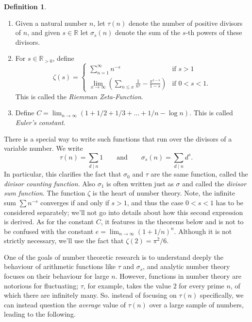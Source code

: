\documentclass[9pt]{report}
\theoremstyle{definition}
\newtheorem{definition}{Definition}
\newcommand\RR{\mathbb R}
\begin{document}
\begin{definition}
    \item
    \begin{enumerate}
        \item Given a natural number \(n\), let \(\tau(n)\) denote the number of positive divisors of \(n\), and given \(s\in\RR\) let \(\sigma_s(n)\) denote the sum of the \(s\)-th powers of these divisors.

        \item For \(s\in\RR_{>0}\), define
            \[
                \zeta(s) =
                \begin{cases}
                    \sum_{n=1}^{\infty} n^{-s} & \text{if } s > 1 \\
                    \lim_{x\to\infty} \left(\sum_{n\le x} \frac{1}{n^s} - \frac{x^{1-s}}{1-s}\right) & \text{if } 0 < s < 1.
                \end{cases}
            \]
            This is called the \textit{Riemman Zeta-Function}.

        \item Define \(C = \lim_{n\to\infty} (1 + 1/2 + 1/3 + \ldots + 1/n - \log n)\).
            This is called \textit{Euler's constant}.
    \end{enumerate}
\end{definition}

There is a special way to write such functions that run over the divisors of a variable number.
We write
\[\tau(n) = \sum_{d\mid n} 1 \qquad \text{and} \qquad \sigma_s(n) = \sum_{d\mid n} d^s.\]
In particular, this clarifies the fact that \(\sigma_0\) and \(\tau\) are the same function, called the \textit{divisor counting function}.
Also \(\sigma_1\) is often written just as \(\sigma\) and called the \textit{divisor sum function}.
The function \(\zeta\) is the heart of number theory.
Note, the infinite sum \(\sum n^{-s}\) converges if and only if \(s>1\), and thus the case \(0<s<1\) has to be considered separately; we'll not go into details about how this second expression is derived.
As for the constant \(C\), it features in the theorems below and is not to be confused with the constant \(e = \lim_{n\to\infty} (1+1/n)^n\).
Although it is not strictly necessary, we'll use the fact that \(\zeta(2) = \pi^2/6\).

One of the goals of number theoretic research is to understand deeply the behaviour of arithmetic functions like \(\tau\) and \(\sigma_s\), and analytic number theory focuses on their behaviour for large \(n\).
However, functions in number theory are notorious for fluctuating; \(\tau\), for example, takes the value \(2\) for every prime \(n\), of which there are infinitely many.
So. instead of focusing on \(\tau(n)\) specifically, we can instead question the \textit{average} value of \(\tau(n)\) over a large sample of numbers, leading to the following.
\end{document}
